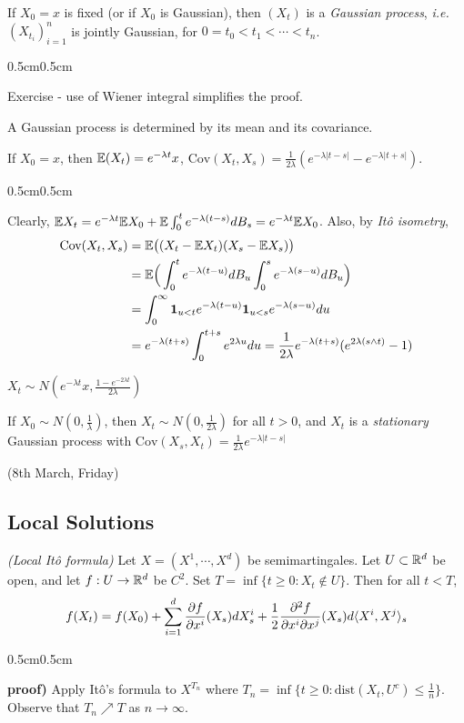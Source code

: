 \documentclass[12pt,a4paper]{article}
\newenvironment{proof}
{\begin{changemargin}{0.5cm}{0.5cm} 
	}%
	{\end{changemargin}
}
\newenvironment{p}
{\begin{proof} 
	}%
	{\end{proof}
}
\begin{document}
\fact If $X_0 =x$ is fixed (or if $X_0$ is Gaussian), then $(X_t)$ is a \emph{Gaussian process}, \textit{i.e.} $(X_{t_i})_{i=1}^n$ is jointly Gaussian, for $0=t_0 < t_1 <\cdots <t_n$.
\begin{p}
\pf Exercise - use of Wiener integral simplifies the proof.
\end{p}
\s

A Gaussian process is determined by its mean and its covariance.
\s

\fact If $X_0 =x$, then $\mathbb{E}(X_t) = e^{-\lambda t} x$, $\text{Cov}(X_t, X_s) = \frac{1}{2\lambda} (e^{-\lambda |t-s|}- e^{-\lambda |t+s|})$.
\begin{p}
\pf Clearly, $\mathbb{E} X_t = e^{-\lambda t} \mathbb{E} X_0 + \mathbb{E} \int_0^t e^{-\lambda (t-s)}dB_s = e^{-\lambda t} \mathbb{E} X_0$. Also, by \emph{It\^o isometry},
\begin{align*}
\text{Cov}(X_t, X_s) &= \mathbb{E} \big( (X_t -\mathbb{E} X_t)(X_s -\mathbb{E} X_s) \big) \\
&= \mathbb{E} \Big( \int_0^t e^{-\lambda (t-u)} dB_u \int_0^s e^{-\lambda (s-u)} dB_u \Big) \\
&= \int_0^{\infty} \bm{1}_{u<t} e^{-\lambda (t-u)} \bm{1}_{u<s} e^{-\lambda (s-u)} du \\
&= e^{-\lambda(t+s)} \int_0^{t+s} e^{2\lambda u} du  = \frac{1}{2\lambda} e^{-\lambda(t+s)} (e^{2\lambda(s\wedge t)}-1)
\end{align*} 
\eop
\end{p}
\s

\corr $X_t \sim N (e^{-\lambda t}x, \frac{1-e^{-2\lambda t}}{2\lambda})$
\s

\fact If $X_0 \sim N(0, \frac{1}{\lambda})$, then $X_t \sim N(0, \frac{1}{2\lambda})$ for all $t>0$, and $X_t$ is a \emph{stationary} Gaussian process with $\text{Cov}(X_s, X_t) = \frac{1}{2\lambda}e^{-\lambda |t-s|}$
\s

\newday

(8th March, Friday)

\subsection{Local Solutions}

\prop \emph{(Local It\^o formula)} Let $X = (X^1, \cdots, X^d)$ be semimartingales. Let $U\subset \mathbb{R}^d$ be open, and let $f: U\rightarrow \mathbb{R}^d$ be $C^2$. Set $T =\inf\{ t\geq 0: X_t \not\in U\}$. Then for all $t<T$,
\begin{align*}
f(X_t) = f(X_0) + \sum_{i=1}^d \frac{\partial f}{\partial x^i} (X_s) dX_s^i + \frac{1}{2}\frac{\partial^2 f}{\partial x^i \partial x^j}(X_s) d\langle X^i, X^j \rangle_s
\end{align*}
\begin{p}
\textbf{proof)} Apply It\^o's formula to $X^{T_n}$ where $T_n = \inf\{ t\geq 0 : \text{dist}(X_t, U^c) \leq \frac{1}{n}\}$. Observe that $T_n \nearrow T$ as $n\rightarrow \infty$. 

\eop
\end{p}
\s
\end{document}

